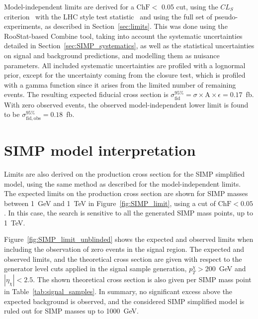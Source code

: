 Model-independent limits are derived for a $\mathrm{ChF} <$ 0.05 cut, using the $CL_S$ criterion~\cite{CLS1,CLS2} with the LHC style test statistic~\cite{ATLAS:2011tau} and using the full set of pseudo-experiments, as described in Section~\ref{sec:limits}. This was done using the RooStat-based Combine tool, taking into account the systematic uncertainties detailed in Section~\ref{sec:SIMP_systematics}, as well as the statistical uncertainties on signal and background predictions, and modelling them as nuisance parameters. All included systematic uncertainties are profiled with a lognormal prior, except for the uncertainty coming from the closure test, which is profiled with a gamma function since it arises from the limited number of remaining events. The resulting expected fiducial cross section is $\sigma_{\mathrm{fid}}^{95\%} = \sigma\times\mathrm{A}\times\epsilon = 0.17$~fb. With zero observed events, the observed model-independent lower limit is found to be $\sigma_{\mathrm{fid, obs}}^{95\%} = 0.18$~fb.

\section{SIMP model interpretation}
\label{sec:SIMP_interpretation}

Limits are also derived on the production cross section for the \ac{SIMP} simplified model, using the same method as described for the model-independent limits.  The expected limits on the production cross section are shown for \ac{SIMP} masses between \SI{1}{GeV} and \SI{1}{TeV} in Figure~\ref{fig:SIMP_limit}, using a cut of $\mathrm{ChF} < 0.05$. In this case, the search is sensitive to all the generated \ac{SIMP} mass points, up to \SI{1}{TeV}.

Figure~\ref{fig:SIMP_limit_unblinded} shows the expected and observed limits when including the observation of zero events in the signal region. The expected and observed limits, and the theoretical cross section are given with respect to the generator level cuts applied in the signal sample generation, $p_T^{\chi} > 200$~GeV and $|\eta_{\chi}| < 2.5$. The shown theoretical cross section is also given per \ac{SIMP} mass point in Table~\ref{tab:signal_samples}. In summary, no significant excess above the expected background is observed, and the considered \ac{SIMP} simplified model is ruled out for \ac{SIMP} masses up to 1000~GeV.


